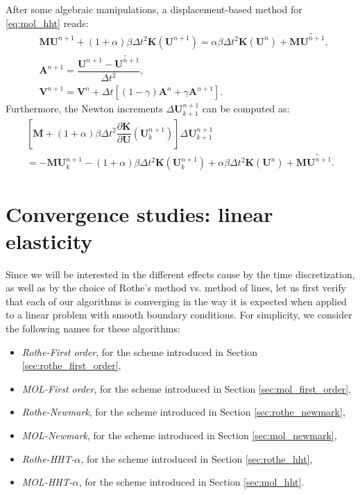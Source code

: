 \documentclass{sfuthesis}
\numberwithin{equation}{section}
\numberwithin{figure}{chapter}
\numberwithin{table}{chapter}
\theoremstyle{definition}
\def\*#1{{\mathbf{#1}}} %
\newcommand{\pder}[2]{\dfrac{\partial #1}{\partial #2}}
\begin{document}
After some algebraic manipulations, a displacement-based method for \eqref{eq:mol_hht} reads:
\begin{subequations}
    \begin{align}
        & \*M \*U^{n+1} + (1+\alpha)\beta \Delta t^2 \*K(\*U^{n+1}) = \alpha \beta \Delta t^2\*K(\*U^{n}) + \*M \widetilde{\*U^{n+1}}, \\
	& \*A^{n+1} = \dfrac{\*U^{n+1} - \widetilde{\*U^{n+1}}}{\Delta t^2}, \\
	& \*V^{n+1} = \*V^n + \Delta t \left[ (1-\gamma) \*A^n + \gamma \*A^{n+1} \right].
    \end{align}
\end{subequations}
Furthermore, the Newton increments $\Delta \*U^{n+1}_{k+1}$ can be computed as:
\begin{multline}
	\left[ \*M + (1+\alpha)\beta \Delta t^2 \pder{\*K}{\*U}(\*U_k^{n+1}) \right] \Delta \*U_{k+1}^{n+1} \\
    = -\*M \*U_k^{n+1} - (1+\alpha)\beta \Delta t^2 \*K(\*U_k^{n+1}) + \alpha \beta \Delta t^2 \*K(\*U^n) + \*M \widetilde{\*U^{n+1}}.
\end{multline}

\section{Convergence studies: linear elasticity} \label{sec:neohookean_convergence_studies}

Since we will be interested in the different effects cause by the time discretization, as well as by the choice of Rothe's method vs. method of lines, let us first verify that each of our algorithms is converging in the way it is expected when applied to a linear problem with smooth boundary conditions. For simplicity, we consider the following names for these algorithms:
\begin{itemize}
    \item \textit{Rothe-First order}, for the scheme introduced in Section \ref{sec:rothe_first_order},
    \item \textit{MOL-First order}, for the scheme introduced in Section \ref{sec:mol_first_order},
    \item \textit{Rothe-Newmark}, for the scheme introduced in Section \ref{sec:rothe_newmark},
    \item \textit{MOL-Newmark}, for the scheme introduced in Section \ref{sec:mol_newmark},
    \item \textit{Rothe-HHT-$\alpha$}, for the scheme introduced in Section \ref{sec:rothe_hht},
    \item \textit{MOL-HHT-$\alpha$}, for the scheme introduced in Section \ref{sec:mol_hht}.
\end{itemize}
\end{document}

